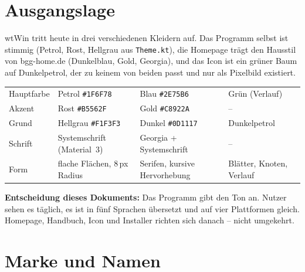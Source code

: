 \documentclass[a4paper, 11pt, parskip=half, headings=small, numbers=noenddot]{scrartcl}
\begin{document}

\tableofcontents
\clearpage

\section{Ausgangslage}

wtWin tritt heute in drei verschiedenen Kleidern auf. Das Programm selbst ist stimmig (Petrol, Rost, Hellgrau aus \texttt{Theme.kt}), die Homepage trägt den Hausstil von bgg-home.de (Dunkelblau, Gold, Georgia), und das Icon ist ein grüner Baum auf Dunkelpetrol, der zu keinem von beiden passt und nur als Pixelbild existiert.

\begin{center}\small\sffamily
\begin{tabularx}{\linewidth}{lYYY}
\toprule
\wtKopf{} &  &  &  \\
\midrule
Hauptfarbe & Petrol \texttt{\#1F6F78} & Blau \texttt{\#2E75B6} & Grün (Verlauf) \\
Akzent & Rost \texttt{\#B5562F} & Gold \texttt{\#C8922A} & – \\
Grund & Hellgrau \texttt{\#F1F3F3} & Dunkel \texttt{\#0D1117} & Dunkelpetrol \\
Schrift & Systemschrift (Material~3) & Georgia + Systemschrift & – \\
Form & flache Flächen, 8\,px Radius & Serifen, kursive Hervorhebung & Blätter, Knoten, Verlauf \\
\bottomrule
\end{tabularx}
\end{center}

\textbf{Entscheidung dieses Dokuments:} Das Programm gibt den Ton an. Nutzer sehen es täglich, es ist in fünf Sprachen übersetzt und auf vier Plattformen gleich. Homepage, Handbuch, Icon und Installer richten sich danach – nicht umgekehrt.

\section{Marke und Namen}
\end{document}
